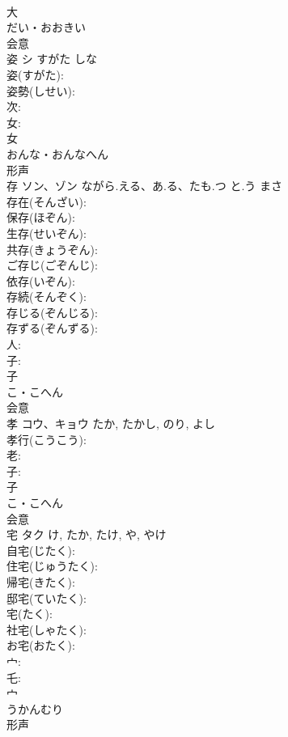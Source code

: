 \documentclass[8pt]{extreport}
\begin{document}
\begin{CJK}{UTF8}{min}
\\	大	
\\	だい・おおきい	
\\	会意 
\\	姿	シ	すがた	しな	
\\	姿(すがた): 
\\	姿勢(しせい): 
\\	次: 
\\	女: 
\\	女	
\\	おんな・おんなへん	
\\	形声 
\\	存	ソン、ゾン	ながら.える、あ.る、たも.つ と.う	まさ	
\\	存在(そんざい): 
\\	保存(ほぞん): 
\\	生存(せいぞん): 
\\	共存(きょうぞん): 
\\	ご存じ(ごぞんじ): 
\\	依存(いぞん): 
\\	存続(そんぞく): 
\\	存じる(ぞんじる): 
\\	存ずる(ぞんずる): 
\\	人: 
\\	子: 
\\	子	
\\	こ・こへん	
\\	会意 
\\	孝	コウ、キョウ		たか, たかし, のり, よし	
\\	孝行(こうこう): 
\\	老: 
\\	子: 
\\	子	
\\	こ・こへん	
\\	会意 
\\	宅	タク		け, たか, たけ, や, やけ	
\\	自宅(じたく): 
\\	住宅(じゅうたく): 
\\	帰宅(きたく): 
\\	邸宅(ていたく): 
\\	宅(たく): 
\\	社宅(しゃたく): 
\\	お宅(おたく): 
\\	宀: 
\\	乇: 
\\	宀	
\\	うかんむり	
\\	形声 

\end{CJK}
\end{document}

